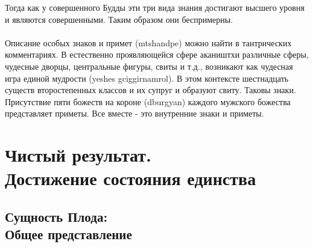 Тогда как у совершенного Будды эти три вида знания достигают высшего уровня и являются
совершенными. Таким образом они беспримерны.\\
\\
Описание особых знаков и примет (mtshandpe) можно найти в тантрических комментариях.
В естественно проявляющейся сфере акаништхи различные сферы, чудесные дворцы,
центральные фигуры, свиты и т.д., возникают как чудесная игра единой мудрости (yeshes
gciggirnamrol). В этом контексте шестнадцать существ второстепенных классов и их 
супруг и образуют свиту. Таковы знаки. Присутствие пяти божеств на короне (dburgyan)
каждого мужского божества представляет приметы. Все вместе - это внутренние знаки и
приметы.

\section{Чистый результат. \\ Достижение состояния единства}

\subsection{Сущность Плода: \\ Общее представление}

